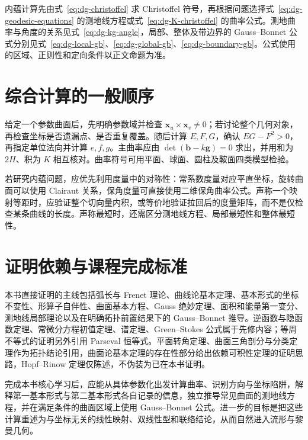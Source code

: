 \documentclass[UTF8,12pt,a4paper,fontset=fandol]{ctexbook}
\begin{document}
内蕴计算先由式~\eqref{eq:dg-christoffel} 求 Christoffel 符号，再根据问题选择式~\eqref{eq:dg-geodesic-equations} 的测地线方程或式~\eqref{eq:dg-K-christoffel} 的曲率公式。测地曲率与角度的关系见式~\eqref{eq:dg-kg-angle}，局部、整体及带边界的 Gauss--Bonnet 公式分别见式~\eqref{eq:dg-local-gb}、\eqref{eq:dg-global-gb}、\eqref{eq:dg-boundary-gb}。公式使用的区域、正则性和定向条件以正文命题为准。

\section{综合计算的一般顺序}
给定一个参数曲面后，先明确参数域并检查 $\mathbf x_u\times\mathbf x_v\ne0$；若讨论整个几何对象，再检查坐标是否遗漏点、是否重复覆盖。随后计算 $E,F,G$，确认 $EG-F^2>0$，再指定单位法向并计算 $e,f,g$。主曲率应由 $\det(\mathbf b-k\mathbf g)=0$ 求出，并用和为 $2H$、积为 $K$ 相互核对。曲率符号可用平面、球面、圆柱及鞍面四类模型检验。

若研究内蕴问题，应优先利用度量中的对称性：常系数度量对应平直坐标，旋转曲面可以使用 Clairaut 关系，保角度量可直接使用二维保角曲率公式。声称一个映射等距时，应验证整个切向量内积，或等价地验证拉回后的度量矩阵，而不是仅检查某条曲线的长度。声称最短时，还需区分测地线方程、局部最短性和整体最短性。

\section{证明依赖与课程完成标准}
本书直接证明的主线包括弧长与 Frenet 理论、曲线论基本定理、基本形式的坐标不变性、形算子自伴性、曲面基本方程、Gauss 绝妙定理、面积和能量第一变分、测地线局部理论以及在明确拓扑前置结果下的 Gauss--Bonnet 推导。逆函数与隐函数定理、常微分方程初值定理、谱定理、Green--Stokes 公式属于先修内容；等周不等式的证明另外引用 Parseval 恒等式。平面转角定理、曲面三角剖分与分类定理作为拓扑结论引用，曲面论基本定理的存在性部分给出依赖可积性定理的证明思路，Hopf--Rinow 定理仅陈述，不伪装为已在本书证明。

完成本书核心学习后，应能从具体参数化出发计算曲率、识别方向与坐标陷阱，解释第一基本形式与第二基本形式各自记录的信息，独立推导常见曲面的测地线方程，并在满足条件的曲面区域上使用 Gauss--Bonnet 公式。进一步的目标是把这些计算重述为与坐标无关的线性映射、双线性型和联络结论，从而自然进入流形与黎曼几何。
\end{document}
